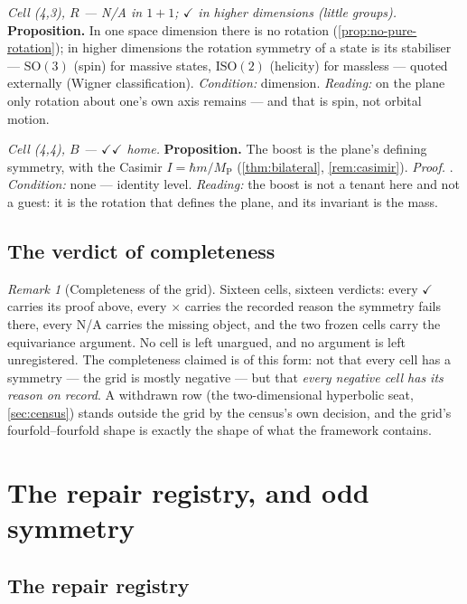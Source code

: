 \documentclass[11pt]{amsbook}
\theoremstyle{plain}
\theoremstyle{definition}
\theoremstyle{remark}
\newtheorem{remark}[theorem]{Remark}
\begin{document}
\emph{Cell (4,3), $R$ --- N/A in $1{+}1$; $\checkmark$ in higher dimensions (little groups).} \textbf{Proposition.} In one space dimension there is no rotation (\cref{prop:no-pure-rotation}); in higher dimensions the rotation symmetry of a state is its stabiliser --- $\mathrm{SO}(3)$ (spin) for massive states, $\mathrm{ISO}(2)$ (helicity) for massless --- quoted externally (Wigner classification). \emph{Condition:} dimension. \emph{Reading:} on the plane only rotation about one's own axis remains --- and that is spin, not orbital motion.

\emph{Cell (4,4), $B$ --- $\checkmark\checkmark$ home.} \textbf{Proposition.} The boost is the plane's defining symmetry, with the Casimir $I = \hbar m/M_{\mathrm P}$ (\cref{thm:bilateral}, \cref{rem:casimir}). \emph{Proof.} . \emph{Condition:} none --- identity level. \emph{Reading:} the boost is not a tenant here and not a guest: it is the rotation that defines the plane, and its invariant is the mass.

\subsection{The verdict of completeness}\label{sec:verdict}

\begin{remark}[Completeness of the grid]\label{rem:grid-complete}
Sixteen cells, sixteen verdicts: every $\checkmark$ carries its proof above, every $\times$ carries the recorded reason the symmetry fails there, every N/A carries the missing object, and the two frozen cells carry the equivariance argument. No cell is left unargued, and no argument is left unregistered. The completeness claimed is of this form: not that every cell has a symmetry --- the grid is mostly negative --- but that \emph{every negative cell has its reason on record}. A withdrawn row (the two-dimensional hyperbolic seat, \cref{sec:census}) stands outside the grid by the census's own decision, and the grid's fourfold--fourfold shape is exactly the shape of what the framework contains.
\end{remark}

\section{The repair registry, and odd symmetry}\label{sec:repair}

\subsection{The repair registry}\label{sec:repair-registry}
\end{document}
